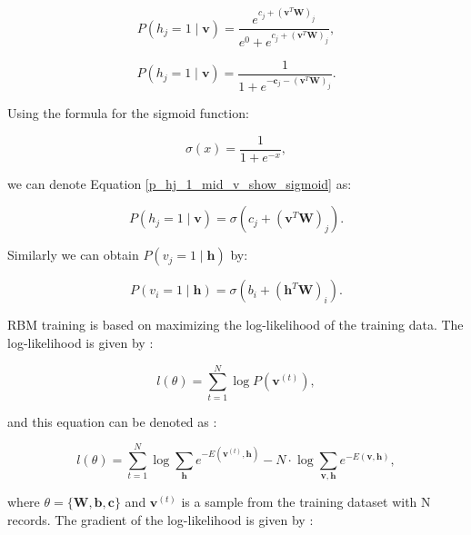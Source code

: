 \documentclass[a4paper,12pt]{article}
\begin{document}
\begin{equation}
    P(h_j=1 \mid \mathbf{v}) = \frac{e^{c_j + (\mathbf{v}^T\mathbf{W})_j}}{e^{0} + e^{c_j + (\mathbf{v}^T\mathbf{W})_j}},
\end{equation}

\begin{equation}\label{p_hj_1_mid_v_show_sigmoid}
    P(h_j=1 \mid \mathbf{v}) = \frac{1}{1 + e^{-\mathbf{c}_j - (\mathbf{v}^T\mathbf{W})_j}}.
\end{equation}

\noindent Using the formula for the sigmoid function:

\begin{equation}\label{sigmoid}
    \sigma(x) = \frac{1}{1 + e^{-x}},
\end{equation}

\noindent we can denote Equation \eqref{p_hj_1_mid_v_show_sigmoid} as:

\begin{equation}\label{p_hj_1_mid_v}
    P(h_j = 1 \mid \mathbf{v}) = \sigma (c_j + (\mathbf{v}^T\mathbf{W})_j).
\end{equation}

\noindent Similarly we can obtain $P(v_j = 1 \mid \mathbf{h})$ by:

\begin{equation}\label{p_vi_1_mid_h}
    P(v_i = 1 \mid \mathbf{h}) = \sigma (b_i + (\mathbf{h}^T\mathbf{W})_i).
\end{equation}

RBM training is based on maximizing the log-likelihood of the training data. The log-likelihood is given by \cite{Dixit2021RBM_DWave}:

\begin{equation}\label{log_likelihood}
    l(\theta) = \sum_{t=1}^N \log P(\mathbf{v}^{(t)}),
\end{equation}

\noindent and this equation can be denoted as \cite{Dixit2021RBM_DWave}:

\begin{equation}\label{log_likelihood_denoted}
    l(\theta) = \sum_{t=1}^N \log \sum_{\mathbf{h}} e^{-E(\mathbf{v}^{(t)}, \mathbf{h})} - N \cdot \log \sum_{\mathbf{v}, \mathbf{h}} e^{-E(\mathbf{v}, \mathbf{h})},
\end{equation}

\noindent where $\theta=\{\mathbf{W}, \mathbf{b}, \mathbf{c}\}$ and $\mathbf{v}^{(t)}$ is a sample from the training dataset with N records. The gradient of the log-likelihood is given by \cite{Dixit2021RBM_DWave}:
\end{document}
